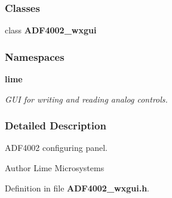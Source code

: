 \subsubsection*{Classes}
\begin{DoxyCompactItemize}
\item 
class {\bf A\+D\+F4002\+\_\+wxgui}
\end{DoxyCompactItemize}
\subsubsection*{Namespaces}
\begin{DoxyCompactItemize}
\item 
 {\bf lime}
\begin{DoxyCompactList}\small\item\em G\+UI for writing and reading analog controls. \end{DoxyCompactList}\end{DoxyCompactItemize}


\subsubsection{Detailed Description}
A\+D\+F4002 configuring panel. 

\begin{DoxyAuthor}{Author}
Lime Microsystems 
\end{DoxyAuthor}


Definition in file {\bf A\+D\+F4002\+\_\+wxgui.\+h}.

